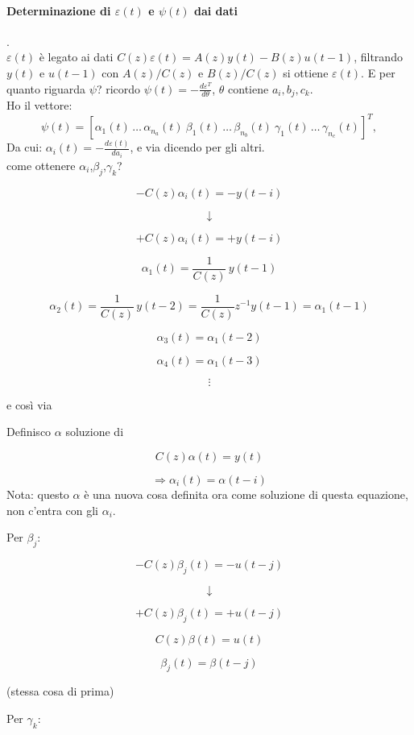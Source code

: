 \documentclass[11pt,a4paper]{article}
\begin{document}
\paragraph{Determinazione di $\varepsilon(t)$ e $\psi(t)$ dai dati}. \\
$\varepsilon(t)$ è legato ai dati $C(z)\varepsilon(t) = A(z)y(t) - B(z)u(t-1)$, filtrando $y(t)$ e $u(t-1)$ con $A(z)/C(z)$ e $B(z)/C(z)$ si ottiene $\varepsilon(t)$.
E per quanto riguarda $\psi$? 
ricordo $\psi(t) = -\tfrac{d\varepsilon^T}{d\theta}$, $\theta$ contiene $a_i, b_j, c_k$. \\
Ho il vettore:
\[
\psi(t)=[\alpha_1(t)\,\dots\,\alpha_{n_a}(t)\ \beta_1(t)\,\dots\,\beta_{n_b}(t)\ \gamma_1(t)\,\dots\,\gamma_{n_c}(t)]^{T},
\]
Da cui: $\alpha_i(t)=-\tfrac{d\varepsilon(t)}{da_i}$, e via dicendo per gli altri. \\
come ottenere $\alpha_i$,$\beta_j$,$\gamma_k$?

\[
-C(z)\alpha_i(t)=-y(t-i)
\]

\[
\downarrow
\]

\[
+C(z)\alpha_i(t)=+y(t-i)
\]

\[
\alpha_1(t)=\frac{1}{C(z)}\,y(t-1)
\]

\[
\alpha_2(t)=\frac{1}{C(z)}\,y(t-2)
=
\frac{1}{C(z)}z^{-1}y(t-1)
=
\alpha_1(t-1)
\]

\[
\alpha_3(t)=\alpha_1(t-2)
\]

\[
\alpha_4(t)=\alpha_1(t-3)
\]

\[
\vdots
\]

e così via

\vspace{0.8em}

Definisco $\alpha$ soluzione di

\[
C(z)\alpha(t)=y(t)
\]

\[
\Rightarrow
\boxed{\alpha_i(t)=\alpha(t-i)}
\]
Nota: questo $\alpha$ è una nuova cosa definita ora come soluzione di questa equazione, non c'entra con gli $\alpha_i$.
\vspace{1em}

Per $\beta_j$:

\[
-C(z)\beta_j(t)=-u(t-j)
\]

\[
\downarrow
\]

\[
+C(z)\beta_j(t)=+u(t-j)
\]

\[
C(z)\beta(t)=u(t)
\]

\[
\beta_j(t)=\beta(t-j)
\]


(stessa cosa di prima)

Per $\gamma_k$:
\end{document}
